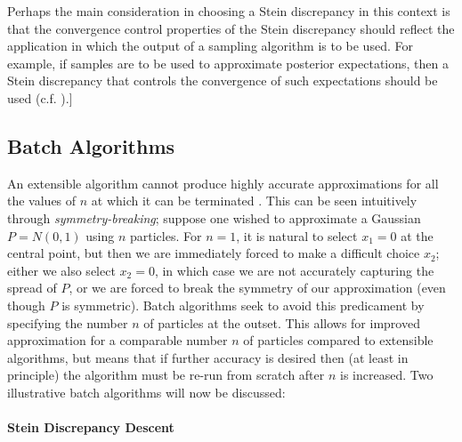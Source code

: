 \documentclass[12pt,paper=letter]{scrreprt}
\begin{document}
Perhaps the main consideration in choosing a Stein discrepancy in this context is that the convergence control properties of the Stein discrepancy should reflect the application in which the output of a sampling algorithm is to be used. 
For example, if samples are to be used to approximate posterior expectations, then a Stein discrepancy that controls the convergence of such expectations should be used (c.f. ).]





\subsection{Batch Algorithms}
\label{subsec: batch}

An extensible algorithm cannot produce highly accurate approximations for all the values of $n$ at which it can be terminated \citep{owen2016constraint}.
This can be seen intuitively through \emph{symmetry-breaking}; suppose one wished to approximate a Gaussian $P = N(0,1)$ using $n$ particles.
For $n = 1$, it is natural to select $x_1 = 0$ at the central point, but then we are immediately forced to make a difficult choice $x_2$; either we also select $x_2 = 0$, in which case we are not accurately capturing the spread of $P$, or we are forced to break the symmetry of our approximation (even though $P$ is symmetric).
Batch algorithms seek to avoid this predicament by specifying the number $n$ of particles at the outset.
This allows for improved approximation for a comparable number $n$ of particles compared to extensible algorithms, but means that if further accuracy is desired then (at least in principle) the algorithm must be re-run from scratch after $n$ is increased.
Two illustrative batch algorithms will now be discussed:

\paragraph{Stein Discrepancy Descent}
\end{document}
